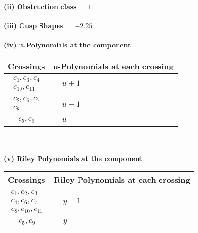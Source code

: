 \documentclass[1p]{elsarticle_modified}
\theoremstyle{definition}
\begin{document}
\flushleft \textbf{(ii) Obstruction class $= 1$}\\~\\
\flushleft \textbf{(iii) Cusp Shapes $= -2.25$}\\~\\
\newpage\renewcommand{\arraystretch}{1}
\flushleft \textbf{(iv) u-Polynomials at the component}\newline \\
\begin{tabular}{m{50pt}|m{274pt}}
Crossings & \hspace{64pt}u-Polynomials at each crossing \\
\hline $$\begin{aligned}c_{1},c_{3},c_{4}\\c_{10},c_{11}\end{aligned}$$&$\begin{aligned}
&u+1
\end{aligned}$\\
\hline $$\begin{aligned}c_{2},c_{6},c_{7}\\c_{8}\end{aligned}$$&$\begin{aligned}
&u-1
\end{aligned}$\\
\hline $$\begin{aligned}c_{5},c_{9}\end{aligned}$$&$\begin{aligned}
&u
\end{aligned}$\\
\hline
\end{tabular}\\~\\
\newpage\renewcommand{\arraystretch}{1}
\flushleft \textbf{(v) Riley Polynomials at the component}\newline \\
\begin{tabular}{m{50pt}|m{274pt}}
Crossings & \hspace{64pt}Riley Polynomials at each crossing \\
\hline $$\begin{aligned}c_{1},c_{2},c_{3}\\c_{4},c_{6},c_{7}\\c_{8},c_{10},c_{11}\end{aligned}$$&$\begin{aligned}
&y-1
\end{aligned}$\\
\hline $$\begin{aligned}c_{5},c_{9}\end{aligned}$$&$\begin{aligned}
&y
\end{aligned}$\\
\hline
\end{tabular}\\~\\
\end{document}
